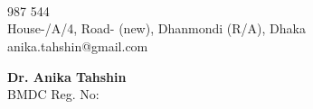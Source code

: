 \documentclass[a4paper,11pt]{article}
\begin{document}
\begin{minipage}[t][4.4cm]{1.2\textwidth}
    \raggedright
    \begin{minipage}[h][2.8cm][h]{0.03\textwidth}
      \faPhone\\
      \faMapMarker\\ \\
      \faEnvelopeO
  \end{minipage}
  \begin{minipage}[h][2.8cm][h]{0.28\textwidth}
      \raggedright
      { 987 544}\\
      House-{/A/4}, Road-{} (new), 
      Dhanmondi (R/A), Dhaka\\
      anika.tahshin{}@gmail.com
  \end{minipage}
\begin{minipage}[h][2.8cm][t]{0.34\textwidth}
    \raggedleft
    {\huge\bfseries\color{black}Dr. Anika Tahshin}\vspace{1mm} \\
    \large{BMDC Reg. No: }
  \end{minipage}

\end{minipage}
\end{document}
